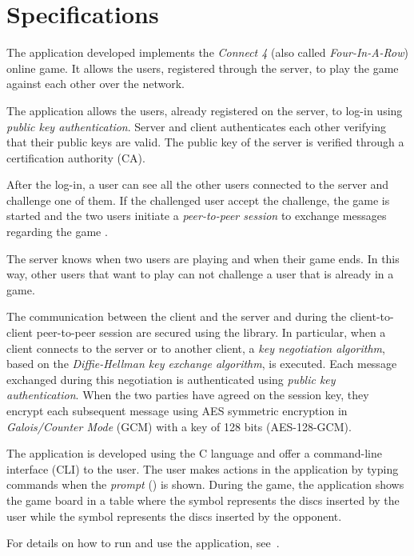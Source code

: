 \chapter{Specifications}\label{ch:specs}

The application developed implements the \emph{Connect 4} (also called
\emph{Four-In-A-Row}) online game. It allows the users, registered through the
server, to play the game against each other over the network.

The application allows the users, already registered on the server, to log-in
using \emph{public key authentication}. Server and client authenticates each
other verifying that their public keys are valid. The public key of the server
is verified through a certification authority (CA).

After the log-in, a user can see all the other users connected to the server and
challenge one of them. If the challenged user accept the challenge, the game is
started and the two users initiate a \emph{peer-to-peer session} to exchange
messages regarding the game .

The server knows when two users are playing and when their game ends. In this
way, other users that want to play can not challenge a user that is already in a
game.

The communication between the client and the server and during the
client-to-client peer-to-peer session are secured using the \openssl{} library.
In particular, when a client connects to the server or to another client, a
\emph{key negotiation algorithm}, based on the \emph{Diffie-Hellman key exchange
algorithm}, is executed. Each message exchanged during this negotiation is
authenticated using \emph{public key authentication}. When the two parties have
agreed on the session key, they encrypt each subsequent message using AES
symmetric encryption in \emph{Galois/Counter Mode} (GCM) with a key of 128 bits
(AES-128-GCM).

The application is developed using the C language and offer a command-line
interface (CLI) to the user. The user makes actions in the application by typing
commands when the \emph{prompt} (\code{>}) is shown. During the game, the
application shows the game board in a table where the  symbol represents
the discs inserted by the user while the  symbol represents the discs
inserted by the opponent.

For details on how to run and use the application,
see~.
